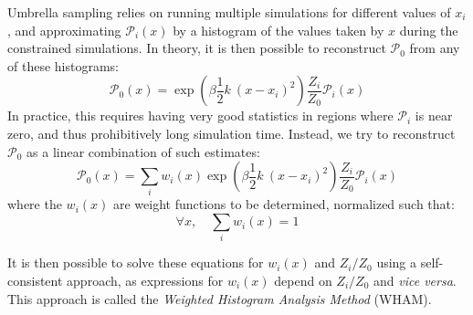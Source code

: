\documentclass[thesis]{subfiles}
\begin{document}
Umbrella sampling relies on running multiple simulations for different values of
$x_i$, and approximating $\mathcal{P}_i(x)$ by a histogram of the values taken
by $x$ during the constrained simulations. In theory, it is then possible to
reconstruct $\mathcal{P}_0$ from any of these histograms:
\[ \mathcal{P}_0(x) = \exp\left(\beta \frac 12 k\ (x - x_i)^2\right) \frac{Z_i}{Z_0} \mathcal{P}_i(x) \]
In practice, this requires having very good statistics in regions where
$\mathcal{P}_i$ is near zero, and thus prohibitively long simulation time.
Instead, we try to reconstruct $\mathcal{P}_0$ as a linear combination of such
estimates:
\[ \mathcal{P}_0(x) = \sum_i w_i(x) \exp\left(\beta \frac 12 k\ (x - x_i)^2\right) \frac{Z_i}{Z_0} \mathcal{P}_i(x) \]
where the $w_i(x)$ are weight functions to be determined, normalized such that:
\[ \forall x, \quad \sum_i w_i(x) = 1\]

It is then possible to solve these equations for $w_i(x)$ and $Z_i/Z_0$ using a
self-consistent approach, as expressions for $w_i(x)$ depend on $Z_i/Z_0$ and
\emph{vice versa}. This approach is called the \emph{Weighted Histogram Analysis
Method}\cite{Kumar1995} (WHAM).

\OnlyInSubfile{\printglobalbibliography}
\end{document}
